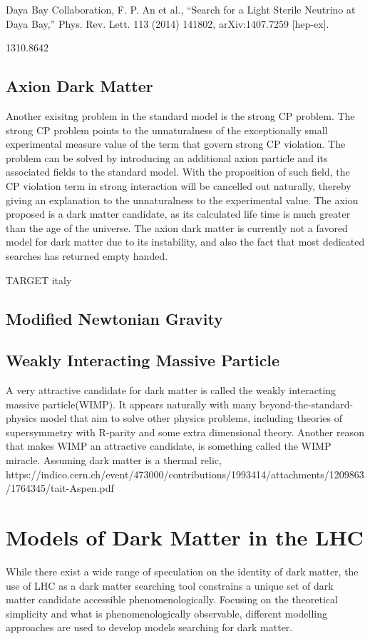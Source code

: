 Daya Bay Collaboration, F. P. An et al., “Search for a Light Sterile Neutrino at Daya Bay,” Phys. Rev. Lett. 113 (2014) 141802, arXiv:1407.7259 [hep-ex].

1310.8642
\subsection{Axion Dark Matter}
Another exisitng problem in the standard model is the strong CP problem. The strong CP problem points to the unnaturalness of the exceptionally small experimental measure value of the term that govern strong CP violation. 
The problem can be solved by introducing an additional axion particle and its associated fields to the standard model. With the proposition of such field, the CP violation term in strong interaction will be cancelled out naturally, thereby giving an explanation to the unnaturalness to the experimental value. 
The axion proposed is a dark matter candidate, as its calculated life time is much greater than the age of the universe. 
The axion dark matter is currently not a favored model for dark matter due to its instability, and also the fact that most dedicated searches has returned empty handed. 

TARGET italy 

\subsection{Modified Newtonian Gravity}

\subsection{Weakly Interacting Massive Particle}
A very attractive candidate for dark matter is called the weakly interacting massive particle(WIMP). It appears naturally with many beyond-the-standard-physics model that aim to solve other physics problems, including theories of supersymmetry with R-parity and some extra dimensional theory. 
Another reason that makes WIMP an attractive candidate, is something called the WIMP miracle. Assuming dark matter is a thermal relic, 
https://indico.cern.ch/event/473000/contributions/1993414/attachments/1209863/1764345/tait-Aspen.pdf

\section{Models of Dark Matter in the LHC}

While there exist a wide range of speculation on the identity of dark matter, the use of LHC as a dark matter searching tool constrains a unique set of dark matter candidate accessible phenomenologically. 
Focusing on the theoretical simplicity and what is phenomenologically observable, different modelling approaches are used to develop models searching for dark matter. 

